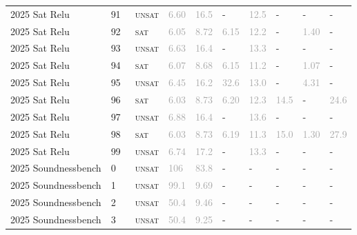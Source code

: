 \begin{center}
{\begin{longtable}{@{}llllllllll@{}}
2025 Sat Relu & 91 & ~\textsc{unsat} & \textcolor{darkgray}{6.60} & \textcolor{darkgray}{16.5} & - & \textcolor{darkgray}{12.5} & - & - & - \\
2025 Sat Relu & 92 & ~\textsc{sat} & \textcolor{darkgray}{6.05} & \textcolor{darkgray}{8.72} & \textcolor{darkgray}{6.15} & \textcolor{darkgray}{12.2} & - & \textcolor{darkgray}{1.40} & - \\
2025 Sat Relu & 93 & ~\textsc{unsat} & \textcolor{darkgray}{6.63} & \textcolor{darkgray}{16.4} & - & \textcolor{darkgray}{13.3} & - & - & - \\
2025 Sat Relu & 94 & ~\textsc{sat} & \textcolor{darkgray}{6.07} & \textcolor{darkgray}{8.68} & \textcolor{darkgray}{6.15} & \textcolor{darkgray}{11.2} & - & \textcolor{darkgray}{1.07} & - \\
2025 Sat Relu & 95 & ~\textsc{unsat} & \textcolor{darkgray}{6.45} & \textcolor{darkgray}{16.2} & \textcolor{darkgray}{32.6} & \textcolor{darkgray}{13.0} & - & \textcolor{darkgray}{4.31} & - \\
2025 Sat Relu & 96 & ~\textsc{sat} & \textcolor{darkgray}{6.03} & \textcolor{darkgray}{8.73} & \textcolor{darkgray}{6.20} & \textcolor{darkgray}{12.3} & \textcolor{darkgray}{14.5} & - & \textcolor{darkgray}{24.6} \\
2025 Sat Relu & 97 & ~\textsc{unsat} & \textcolor{darkgray}{6.88} & \textcolor{darkgray}{16.4} & - & \textcolor{darkgray}{13.6} & - & - & - \\
2025 Sat Relu & 98 & ~\textsc{sat} & \textcolor{darkgray}{6.03} & \textcolor{darkgray}{8.73} & \textcolor{darkgray}{6.19} & \textcolor{darkgray}{11.3} & \textcolor{darkgray}{15.0} & \textcolor{darkgray}{1.30} & \textcolor{darkgray}{27.9} \\
2025 Sat Relu & 99 & ~\textsc{unsat} & \textcolor{darkgray}{6.74} & \textcolor{darkgray}{17.2} & - & \textcolor{darkgray}{13.3} & - & - & - \\
\midrule
2025 Soundnessbench & 0 & ~\textsc{unsat} & \textcolor{darkgray}{106} & \textcolor{darkgray}{83.8} & - & - & - & - & - \\
2025 Soundnessbench & 1 & ~\textsc{unsat} & \textcolor{darkgray}{99.1} & \textcolor{darkgray}{9.69} & - & - & - & - & - \\
2025 Soundnessbench & 2 & ~\textsc{unsat} & \textcolor{darkgray}{50.4} & \textcolor{darkgray}{9.46} & - & - & - & - & - \\
2025 Soundnessbench & 3 & ~\textsc{unsat} & \textcolor{darkgray}{50.4} & \textcolor{darkgray}{9.25} & - & - & - & - & - \\

\end{longtable}}
\end{center}
